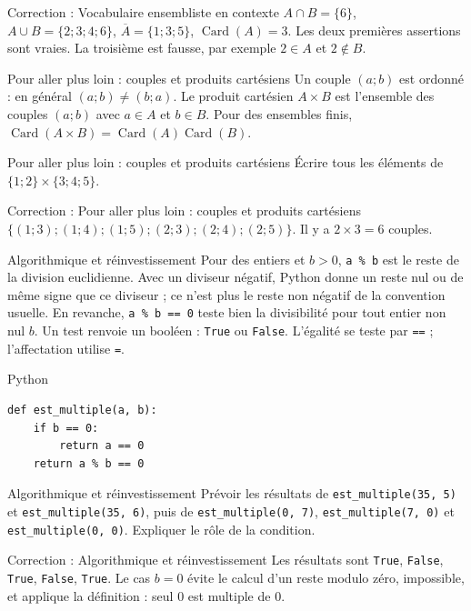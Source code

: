 \documentclass[aspectratio=169,10pt]{beamer}
\providecommand{\Card}{\operatorname{Card}}
\begin{document}
\begin{frame}{Correction : Vocabulaire ensembliste en contexte}
\(A\cap B=\{6\}\), \(A\cup B=\{2;3;4;6\}\), \(\overline A=\{1;3;5\}\), \(\Card(A)=3\). Les deux premières assertions sont vraies. La troisième est fausse, par exemple \(2\in A\) et \(2\notin B\).
\end{frame}
\begin{frame}{Pour aller plus loin : couples et produits cartésiens}
Un couple \((a;b)\) est ordonné : en général \((a;b)\ne(b;a)\). Le produit cartésien \(A\times B\) est l'ensemble des couples \((a;b)\) avec \(a\in A\) et \(b\in B\). Pour des ensembles finis, \(\Card(A\times B)=\Card(A)\Card(B)\).
\end{frame}
\begin{frame}{Pour aller plus loin : couples et produits cartésiens}
Écrire tous les éléments de \(\{1;2\}\times\{3;4;5\}\).
\end{frame}
\begin{frame}{Correction : Pour aller plus loin : couples et produits cartésiens}
\(\{(1;3);(1;4);(1;5);(2;3);(2;4);(2;5)\}\). Il y a \(2\times3=6\) couples.
\end{frame}
\begin{frame}{Algorithmique et réinvestissement}
Pour des entiers et \(b>0\), \texttt{a \% b} est le reste de la division euclidienne. Avec un diviseur négatif, Python donne un reste nul ou de même signe que ce diviseur ; ce n’est plus le reste non négatif de la convention usuelle. En revanche, \texttt{a \% b == 0} teste bien la divisibilité pour tout entier non nul \(b\). Un test renvoie un booléen : \texttt{True} ou \texttt{False}. L’égalité se teste par \texttt{==} ; l’affectation utilise \texttt{=}.
\end{frame}
\begin{frame}[fragile]{Python}
\small
\begin{verbatim}
def est_multiple(a, b):
    if b == 0:
        return a == 0
    return a % b == 0
\end{verbatim}
\end{frame}
\begin{frame}{Algorithmique et réinvestissement}
Prévoir les résultats de \texttt{est\_multiple(35, 5)} et \texttt{est\_multiple(35, 6)}, puis de \texttt{est\_multiple(0, 7)}, \texttt{est\_multiple(7, 0)} et \texttt{est\_multiple(0, 0)}. Expliquer le rôle de la condition.
\end{frame}
\begin{frame}{Correction : Algorithmique et réinvestissement}
Les résultats sont \texttt{True}, \texttt{False}, \texttt{True}, \texttt{False}, \texttt{True}. Le cas \(b=0\) évite le calcul d'un reste modulo zéro, impossible, et applique la définition : seul \(0\) est multiple de \(0\).
\end{frame}
\end{document}
